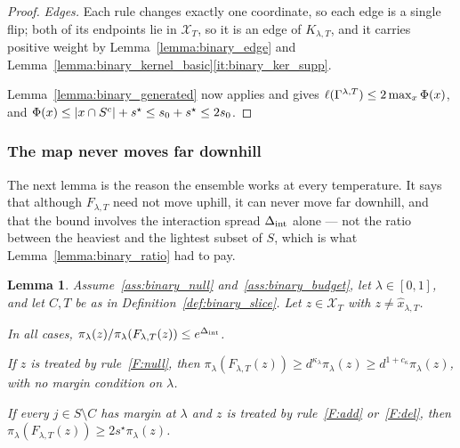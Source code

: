 \documentclass[aos]{imsart}%
\DeclarePairedDelimiter{\abs}{\lvert}{\rvert}
\newcommand{\ambientspace}[0]{\mathcal{X}}
\theoremstyle{plain}
\newtheorem{lemma}[theorem]{Lemma}
\theoremstyle{definition}
\begin{document}
\begin{proof}
        \emph{Edges.} Each rule changes exactly one coordinate, so each edge is
        a single flip; both of its endpoints lie in $\ambientspace_T$, so it is
        an edge of $K_{\lambda,T}$, and it carries positive weight by
        Lemma~\ref{lemma:binary_edge} and
        Lemma~\ref{lemma:binary_kernel_basic}\ref{it:binary_ker_supp}.

        Lemma~\ref{lemma:binary_generated} now applies and gives
        $\ell(\Gamma^{\lambda,T})\leq2\max_x\Phi(x)$, and
        $\Phi(x)\leq\abs{x\cap S^{c}}+s^{\star}\leq s_0+s^{\star}\leq2s_0$.
    \end{proof}

    \subsubsection{The map never moves far downhill}

    The next lemma is the reason the ensemble works at every temperature. It
    says that although $F_{\lambda,T}$ need not move uphill, it can never move
    far downhill, and that the bound involves the interaction spread $\Delta_{\mathrm{int}}$
    alone --- not the ratio between the heaviest and the lightest subset of
    $S$, which is what Lemma~\ref{lemma:binary_ratio} had to pay.

    \begin{lemma}
        \label{lemma:binary_drop}
        Assume~\ref{ass:binary_null} and~\ref{ass:binary_budget}, let
        $\lambda\in[0,1]$, and let $C,T$ be as in
        Definition~\ref{def:binary_slice}. Let
        $z\in\ambientspace_T$ with $z\neq\hat x_{\lambda,T}$.
        \begin{equivcond}
            \item\label{it:binary_drop_i}
            In all cases,
            $\pi_\lambda(z)/\pi_\lambda(F_{\lambda,T}(z))\leq e^{\Delta_{\mathrm{int}}}$.
            \item\label{it:binary_drop_ii}
            If $z$ is treated by rule~\ref{F:null}, then
            $\pi_\lambda(F_{\lambda,T}(z))\geq d^{\kappa_\lambda}\pi_\lambda(z)
            \geq d^{1+c_\kappa}\pi_\lambda(z)$, with no margin condition on
            $\lambda$.
            \item\label{it:binary_drop_iii}
            If every $j\in S\setminus C$ has margin at $\lambda$ and $z$ is
            treated by rule~\ref{F:add} or~\ref{F:del}, then
            $\pi_\lambda(F_{\lambda,T}(z))\geq2s^{\star}\pi_\lambda(z)$.
        \end{equivcond}
    \end{lemma}
\end{document}
